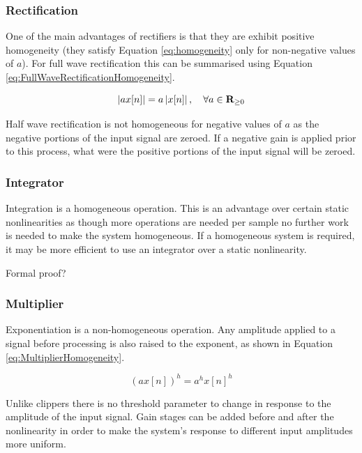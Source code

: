 		\subsubsection*{Rectification}
			One of the main advantages of rectifiers is that they are exhibit positive homogeneity (they
			satisfy Equation \ref{eq:homogeneity} only for non-negative values of $a$). For full wave
			rectification this can be summarised using Equation \ref{eq:FullWaveRectificationHomogeneity}.

			\begin{equation}
				\left|ax[n]\right| = a\left|x[n]\right|, \quad \forall a \in \textbf{R}_{\geq 0}
				\label{eq:FullWaveRectificationHomogeneity}
			\end{equation}

			Half wave rectification is not homogeneous for negative values of $a$ as the negative portions of
			the input signal are zeroed. If a negative gain is applied prior to this process, what were the
			positive portions of the input signal will be zeroed.

		\subsubsection*{Integrator}
			Integration is a homogeneous operation. This is an advantage over certain static nonlinearities as
			though more operations are needed per sample no further work is needed to make the system
			homogeneous. If a homogeneous system is required, it may be more efficient to use an integrator
			over a static nonlinearity.
		
			\note
			{
				Formal proof?
			}

		\subsubsection*{Multiplier}
			Exponentiation is a non-homogeneous operation. Any amplitude applied to a signal before processing
			is also raised to the exponent, as shown in Equation \ref{eq:MultiplierHomogeneity}.

			\begin{equation}
				(ax[n])^{h} = a^{h}x[n]^{h}
				\label{eq:MultiplierHomogeneity}
			\end{equation}

			Unlike clippers there is no threshold parameter to change in response to the amplitude of the input
			signal. Gain stages can be added before and after the nonlinearity in order to make the system's
			response to different input amplitudes more uniform.

